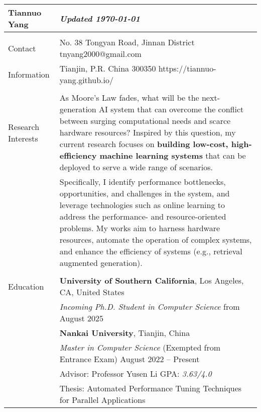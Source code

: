 \documentclass[letterpaper, 10pt]{article}
\begin{document}
\begin{longtable}{p{}p{}}

\textbf{Tiannuo Yang} & \hfill{\it\footnotesize Updated \today} \\
\hline \\



\textcolor{OliveGreen}{Contact} & No. 38 Tongyan Road, Jinnan District \hfill tnyang2000@gmail.com \\
\textcolor{OliveGreen}{Information} & Tianjin, P.R. China 300350 \hfill  https://tiannuo-yang.github.io/ \\
& \\



\nohyphens{\textcolor{OliveGreen}{Research Interests}}
& As Moore’s Law fades, what will be the next-generation AI system that can overcome the conflict between surging computational needs and scarce hardware resources? Inspired by this question, my current research focuses on \textbf{building low-cost, high-efficiency machine learning systems} that can be deployed to serve a wide range of scenarios.
\vspace{0.01\textwidth} \\
& Specifically, I identify performance bottlenecks, opportunities, and challenges in the system, and leverage technologies such as online learning to address the performance- and resource-oriented problems. My works aim to harness hardware resources, automate the operation of complex systems, and enhance the efficiency of systems (e.g., retrieval augmented generation). \\
& \\



\textcolor{OliveGreen}{Education} 
& \textbf{University of Southern California}, Los Angeles, CA, United States \\
& \textcolor[RGB]{200, 0, 0}{\textit{Incoming Ph.D. Student in Computer Science}} \hfill from August 2025 \vspace{0.01\textwidth} \\

& \textbf{Nankai University}, Tianjin, China \\ 
& \textit{Master in Computer Science} (Exempted from Entrance Exam) \hfill August 2022 -- Present \\
& Advisor: Professor Yusen Li \hspace{0.04\textwidth} GPA: \textit{3.63/4.0} \\
& Thesis: Automated Performance Tuning Techniques for Parallel Applications \vspace{0.01\textwidth} \\


\end{longtable}
\end{document}
